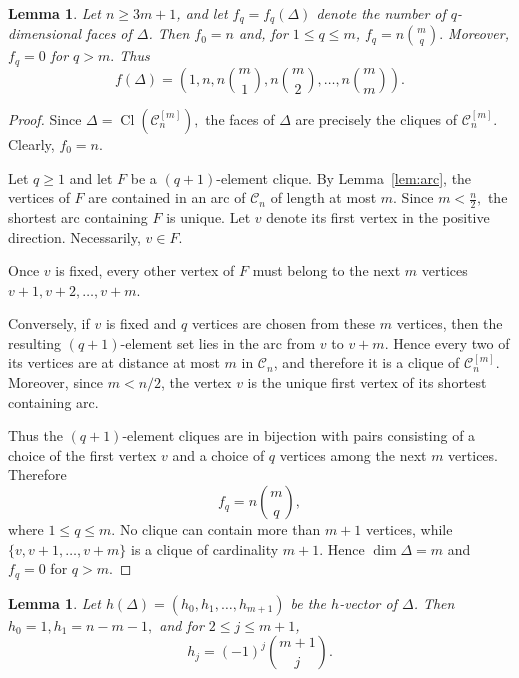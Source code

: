 \documentclass[12pt,reqno]{amsart}
\newtheorem{lemma}[theorem]{Lemma}
\theoremstyle{definition}
\numberwithin{equation}{section}
\def\C{\mathcal{C}}
\begin{document}
\begin{lemma}\label{lem:fvector}
Let $n\geq3m+1$, and let $f_q=f_q(\Delta)$ denote the number of
$q$-dimensional faces of $\Delta$. Then \( f_0=n \)
and, for $1\leq q\leq m$, \( f_q=n\binom{m}{q}. \)
Moreover, \( f_q=0 \) for \( q>m. \)
Thus
\[
f(\Delta)
=
\left(
1,n,n\binom{m}{1},n\binom{m}{2},\ldots,n\binom{m}{m}
\right).
\]
\end{lemma}
\begin{proof}
	Since \( \Delta=\operatorname{Cl}(\C_n^{[m]}), \)
	the faces of $\Delta$ are precisely the cliques of $\C_n^{[m]}$.
	Clearly, \( f_0=n. \)
	
	Let $q\geq1$ and let $F$ be a $(q+1)$-element clique. By
	Lemma~\ref{lem:arc}, the vertices of $F$ are contained in an arc of
	$\C_n$ of length at most $m$. Since
	\( m<\frac n2, \)
	the shortest arc containing $F$ is unique. Let $v$ denote its first
	vertex in the positive direction. Necessarily,
	\( v\in F. \)
	
	Once $v$ is fixed, every other vertex of $F$ must belong to the next
	$m$ vertices \( v+1,v+2,\ldots,v+m. \)
	
	Conversely, if $v$ is fixed and $q$ vertices are chosen from these
	$m$ vertices, then the resulting $(q+1)$-element set lies in the arc
	from $v$ to $v+m$. Hence every two of its vertices are at distance at
	most $m$ in $\C_n$, and therefore it is a clique of $\C_n^{[m]}$.
	Moreover, since $m<n/2$, the vertex $v$ is the unique first vertex of
	its shortest containing arc.
	
	Thus the $(q+1)$-element cliques are in bijection with pairs consisting
	of a choice of the first vertex $v$ and a choice of $q$ vertices among
	the next $m$ vertices. Therefore \[	f_q=n\binom{m}{q},\]
	where \( 1\leq q\leq m. \)
	No clique can contain more than $m+1$ vertices, while \( \{v,v+1,\ldots,v+m\} \)
	is a clique of cardinality $m+1$. Hence \( \dim\Delta=m \)
	and \( f_q=0 \) for \( q>m. \)
\end{proof}

\begin{lemma}\label{lem:hvector}
Let \( h(\Delta)=(h_0,h_1,\ldots,h_{m+1}) \)
be the $h$-vector of $\Delta$. Then \( h_0=1, h_1=n-m-1, \) 
and for  \( 2\leq j\leq m+1 \),
\[
h_j=(-1)^j\binom{m+1}{j}.
\]
\end{lemma}
\end{document}
